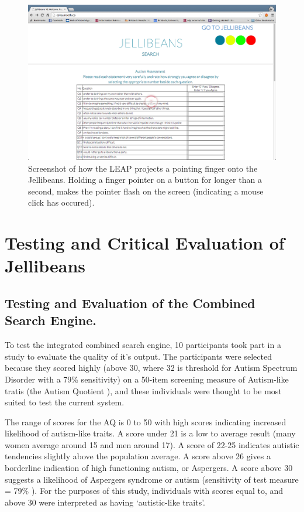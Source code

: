 \documentclass[a4paper, 11pt]{article}
\begin{document}
\begin{figure}[H]
\begin{center}
\includegraphics[scale=0.25]{leapweb}
\caption{Screenshot of how the LEAP projects a pointing finger onto the Jellibeans. Holding a finger pointer on a button for longer than a second, makes the pointer flash on the screen (indicating a mouse click has occured).}
\label{LeapOnTheWebsite}
\end{center}
\end{figure}

\section{Testing and Critical Evaluation of Jellibeans}
\subsection{Testing and Evaluation of the Combined Search Engine.}
To test the integrated combined search engine, 10 participants took part in a study to evaluate the quality of it's output. The participants were selected because they scored highly (above 30, where 32 is threshold for Autism Spectrum Disorder with a 79\% sensitivity) on a 50-item screening measure of Autism-like tratis (the Autism Quotient \cite{Baron Cohen et al}), and these individuals were thought to be most suited to test the current system. 

\vspace{5mm}
The range of scores for the AQ is 0 to 50 with high scores indicating increased likelihood of autism-like traits. A score under 21 is a low to average result (many women average around 15 and men around 17). A score of 22-25 indicates autistic tendencies slightly above the population average. A score above 26 gives a borderline indication of high functioning autism, or Aspergers. A score above 30 suggests a likelihood of Aspergers syndrome or autism (sensitivity of test measure = 79\% \cite{Baron Cohen et al}). For the purposes of this study, individuals with scores equal to, and above 30 were interpreted as having `autistic-like traits'.
\end{document}
